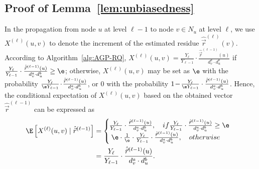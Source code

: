 \subsection{Proof of Lemma~\ref{lem:unbiasedness}}\label{sec:unbiasedness}
In the propagation from node $u$ at level $\ell-1$ to node $v \in N_u$ at level $\ell$, we use $X^{(\ell)}(u,v)$ to denote the increment of the estimated residue $\hat{\vec{r}}^{(\ell)}(v)$. According to Algorithm~\ref{alg:AGP-RQ}, $X^{(\ell)}(u,v)=\frac{Y_{\ell}}{Y_{\ell-1}}\cdot \frac{\hat{\vec{r}}^{(\ell-1)}(u)}{d_v^a\cdot d_u^b}$ if $\frac{Y_{\ell}}{Y_{\ell-1}}\cdot \frac{\hat{\vec{r}}^{(\ell-1)}(u)}{d_v^a\cdot d_u^b}\ge \e$; otherwise, $X^{(\ell)}(u,v)$ may be set as $\e$ with the probability $\frac{Y_{\ell}}{\e Y_{\ell-1}}\hspace{-0.5mm}\cdot \hspace{-0.5mm} \frac{\hat{\vec{r}}^{(\ell-1)}(u)}{d_v^a\cdot d_u^b}$, or $0$ with the probability $1\hspace{-0.5mm}-\hspace{-0.5mm}\frac{Y_{\ell}}{\e Y_{\ell-1}}\cdot \frac{\hat{\vec{r}}^{(\ell-1)}(u)}{d_v^a\cdot d_u^b}$. Hence, the conditional expectation of $X^{(\ell)}(u,v)$ based on the obtained vector $\hat{\vec{r}}^{(\ell-1)}$ can be expressed as 
\begin{equation}\nonumber
\begin{aligned}
\hspace{-1mm} \E \left[ X^{(\ell)}(u,v) \mid \hat{\vec{r}}^{(\ell-1)} \right]
&=\left\{
\begin{array}{ll}
\hspace{-2mm} \frac{Y_{\ell}}{Y_{\ell-1}}\cdot \frac{\hat{\vec{r}}^{(\ell-1)}(u)}{d_v^a\cdot d_u^b}, \quad if \frac{Y_{\ell}}{Y_{\ell-1}}\cdot \frac{\hat{\vec{r}}^{(\ell-1)}(u)}{d_v^a\cdot d_u^b}\ge \e\\
\hspace{-1mm} \e\cdot \frac{1}{\e}\cdot \frac{Y_{\ell}}{Y_{\ell-1}}\cdot \frac{\hat{\vec{r}}^{(\ell-1)}(u)}{d_v^a\cdot d_u^b}, \quad otherwise
\end{array} 
\right.\\
&= \frac{Y_{\ell}}{Y_{\ell-1}}\cdot \frac{\hat{\vec{r}}^{(\ell-1)}(u)}{d_v^a\cdot d_u^b}.
\end{aligned}
\end{equation}
